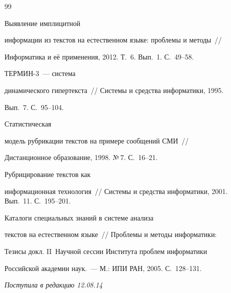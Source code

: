 {{\begin{thebibliography}{99}

     Выявление имплицитной

информации из текстов на естественном языке: проблемы и методы~/\!\!/

Информатика и её применения, 2012. Т.~6. Вып.~1. С.~49--58.


     ТЕРМИН-3~--- сис\-те\-ма

динамического гипертекста~/\!\!/ Сис\-те\-мы и средства информатики, 1995.

Вып.~7. С.~95--104.


     Статистическая

модель рубрикации текстов на примере сообщений СМИ~/\!\!/

Дистанционное образование, 1998. №\,7. С.~16--21.


 Рубрицирование текстов как

информационная технология~/\!\!/ Системы и средства информатики, 2001. Вып.~11. С.~195--201.


     Каталоги специальных знаний в системе анализа

текстов на естественном языке~/\!\!/ Проблемы и методы информатики:

Тезисы докл. II~Научной сессии Института проблем информатики

Российской академии наук.~--- М.: ИПИ РАН, 2005. С.~128--131.

\end{thebibliography}

} }





\vspace*{-6pt}



\hfill{\small\textit{Поступила в редакцию 12.08.14}}








\vspace*{8pt}



